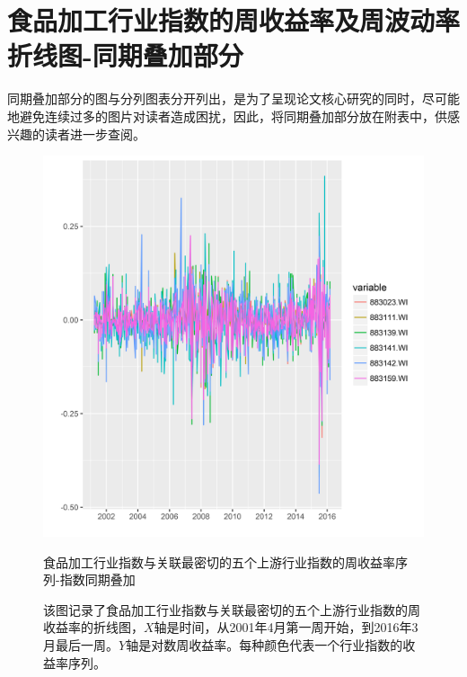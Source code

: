 \documentclass{sysuthesis}
\begin{document}
\chapter{食品加工行业指数的周收益率及周波动率折线图-同期叠加部分}

同期叠加部分的图与分列图表分开列出，是为了呈现论文核心研究的同时，尽可能地避免连续过多的图片对读者造成困扰，因此，将同期叠加部分放在附表中，供感兴趣的读者进一步查阅。

\begin{figure}[htbp]
\centering
\includegraphics[scale=0.8]{image/883111-topk-upper-plus-one-weeklyyield-combined.png}
\caption{食品加工行业指数与关联最密切的五个上游行业指数的周收益率序列-指数同期叠加}
\caption*{\footnotesize 该图记录了食品加工行业指数与关联最密切的五个上游行业指数的周收益率的折线图，$X$轴是时间，从2001年4月第一周开始，到2016年3月最后一周。$Y$轴是对数周收益率。每种颜色代表一个行业指数的收益率序列。}
\label{fig:883111-topk-upper-plus-one-weeklyyield-combined}
\end{figure}
\end{document}
